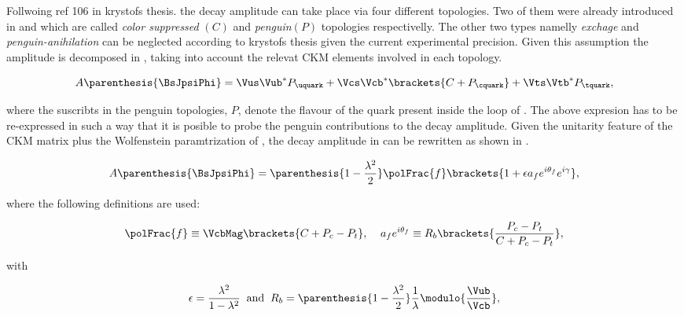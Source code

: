 


Follwoing {\color{red} ref 106 in krystofs thesis.} the \BsJpsiPhi decay amplitude can take place via four different topologies.
Two of them were already introduced in  and  which are called {\it color suppressed }$(C)$ and {\it penguin}$(P)$
topologies respectivelly. The other two types namelly {\it exchage} and {\it penguin-anihilation} can be neglected according to {\color{red} krystofs thesis}
given the current experimental precision. Given this assumption the \BsJpsiPhi amplitude is decomposed in , taking into account the
relevat CKM elements involved in each topology.

\begin{equation}
A \parenthesis{\BsJpsiPhi} = \Vus\Vub^*P_{\uquark} + \Vcs\Vcb^*\brackets{C +P_{\cquark}} + \Vts\Vtb^*P_{\tquark},
 \label{bsjpsiphi_amp}
\end{equation}

\noindent where the suscribts in the penguin topologies, $P$, denote the flavour of the quark present inside the loop of .
The above expresion  has to be re-expressed in such a way that it is posible to probe the penguin contributions to
the \BsJpsiPhi decay amplitude. Given the unitarity feature of the CKM matrix plus the Wolfenstein paramtrization of ,
the decay amplitude in  can be rewritten as shown in .

\begin{equation}
  A \parenthesis{\BsJpsiPhi} = \parenthesis{1-\frac{\lambda^2}{2}} \polFrac{f} \brackets{ 1 + \epsilon a_f e^{i\theta_f} e^{i\gamma} },
 \label{bsjpsiphi_amp_param}
\end{equation}

\noindent where the following definitions are used:

\begin{equation}
  \polFrac{f} \equiv \VcbMag \brackets{C + P_c - P_t}, \;\;\;\; a_f e^{i\theta_f} \equiv R_b \brackets{ \frac{P_c - P_t}{C + P_c - P_t} },
  \label{bsjpsiphi_amp_param_defs}
\end{equation}

\noindent with

\begin{equation}
  \epsilon = \frac{\lambda^2}{1-\lambda^2} \;\;\text{and} \;\;  R_b = \parenthesis{1-\frac{\lambda^2}{2}} \frac{1}{\lambda} \modulo{\frac{\Vub}{\Vcb}},
  \label{bsjpsiphi_amp_param_defs_II}
\end{equation}

